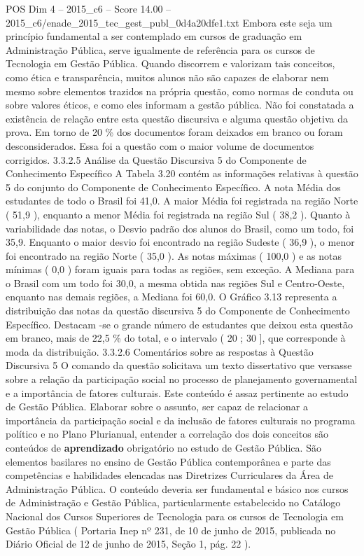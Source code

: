 \begin{textsample}{POS Dim 4 – 2015\_c6 – Score 14.00 – 2015\_c6/enade\_2015\_tec\_gest\_publ\_0d4a20dfe1.txt}
Embora este seja um princípio fundamental a ser contemplado em cursos de graduação em Administração Pública, serve igualmente de referência para os cursos de Tecnologia em Gestão Pública.
Quando discorrem e valorizam tais conceitos, como ética e transparência, muitos alunos não são capazes de elaborar nem mesmo sobre elementos trazidos na própria questão, como normas de conduta ou sobre valores éticos, e como eles informam a gestão pública.
Não foi constatada a existência de relação entre esta questão discursiva e alguma questão objetiva da prova.
Em torno de 20 \% dos documentos foram deixados em branco ou foram desconsiderados.
Essa foi a questão com o maior volume de documentos corrigidos. 3.3.2.5 Análise da Questão Discursiva 5 do Componente de Conhecimento Específico A Tabela 3.20 contém as informações relativas à questão 5 do conjunto do Componente de Conhecimento Específico.
A nota Média dos estudantes de todo o Brasil foi 41,0.
A maior Média foi registrada na região Norte ( 51,9 ), enquanto a menor Média foi registrada na região Sul ( 38,2 ).
Quanto à variabilidade das notas, o Desvio padrão dos alunos do Brasil, como um todo, foi 35,9.
Enquanto o maior desvio foi encontrado na região Sudeste ( 36,9 ), o menor foi encontrado na região Norte ( 35,0 ).
As notas máximas ( 100,0 ) e as notas mínimas ( 0,0 ) foram iguais para todas as regiões, sem exceção.
A Mediana para o Brasil com um todo foi 30,0, a mesma obtida nas regiões Sul e Centro-Oeste, enquanto nas demais regiões, a Mediana foi 60,0.
O Gráfico 3.13 representa a distribuição das notas da questão discursiva 5 do Componente de Conhecimento Específico.
Destacam -se o grande número de estudantes que deixou esta questão em branco, mais de 22,5 \% do total, e o intervalo ( 20 ; 30 ], que corresponde à moda da distribuição. 3.3.2.6 Comentários sobre as respostas à Questão Discursiva 5 O comando da questão solicitava um texto dissertativo que versasse sobre a relação da participação social no processo de planejamento governamental e a importância de fatores culturais.
Este conteúdo é assaz pertinente ao estudo de Gestão Pública.
Elaborar sobre o assunto, ser capaz de relacionar a importância da participação social e da inclusão de fatores culturais no programa político e no Plano Plurianual, entender a correlação dos dois conceitos são conteúdos de \textbf{aprendizado} obrigatório no estudo de Gestão Pública.
São elementos basilares no ensino de Gestão Pública contemporânea e parte das competências e habilidades elencadas nas Diretrizes Curriculares da Área de Administração Pública.
O conteúdo deveria ser fundamental e básico nos cursos de Administração e Gestão Pública, particularmente estabelecido no Catálogo Nacional dos Cursos Superiores de Tecnologia para os cursos de Tecnologia em Gestão Pública ( Portaria Inep nº 231, de 10 de junho de 2015, publicada no Diário Oficial de 12 de junho de 2015, Seção 1, pág. 22 ).

\end{textsample}
